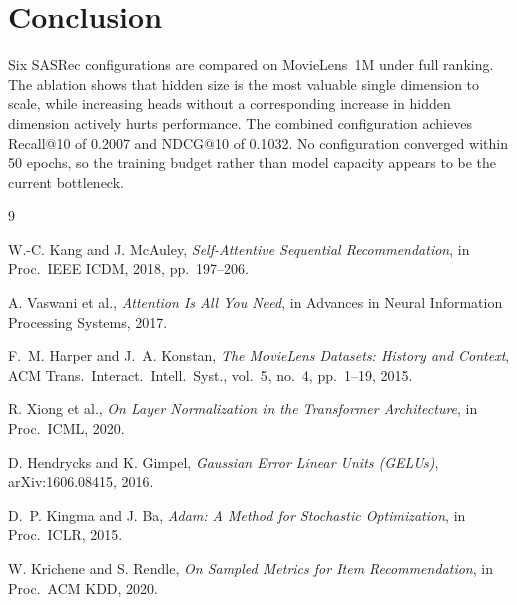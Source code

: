 \documentclass[sigconf]{acmart}
\begin{document}
\section{Conclusion}

Six SASRec configurations are compared on MovieLens~1M under full ranking. The
ablation shows that hidden size is the most valuable single dimension to scale,
while increasing heads without a corresponding increase in hidden dimension
actively hurts performance. The combined configuration achieves Recall@10 of
0.2007 and NDCG@10 of 0.1032. No configuration converged within 50 epochs, so
the training budget rather than model capacity appears to be the current
bottleneck.



\begin{thebibliography}{9}

  W.-C. Kang and J. McAuley,
  \textit{Self-Attentive Sequential Recommendation},
  in Proc.\ IEEE ICDM, 2018, pp.\ 197--206.

  A. Vaswani et al.,
  \textit{Attention Is All You Need},
  in Advances in Neural Information Processing Systems, 2017.

  F.~M. Harper and J.~A. Konstan,
  \textit{The MovieLens Datasets: History and Context},
  ACM Trans.\ Interact.\ Intell.\ Syst., vol.~5, no.~4, pp.~1--19, 2015.

  R. Xiong et al.,
  \textit{On Layer Normalization in the Transformer Architecture},
  in Proc.\ ICML, 2020.

  D. Hendrycks and K. Gimpel,
  \textit{Gaussian Error Linear Units (GELUs)},
  arXiv:1606.08415, 2016.

  D.~P. Kingma and J. Ba,
  \textit{Adam: A Method for Stochastic Optimization},
  in Proc.\ ICLR, 2015.

  W. Krichene and S. Rendle,
  \textit{On Sampled Metrics for Item Recommendation},
  in Proc.\ ACM KDD, 2020.

\end{thebibliography}
\end{document}
